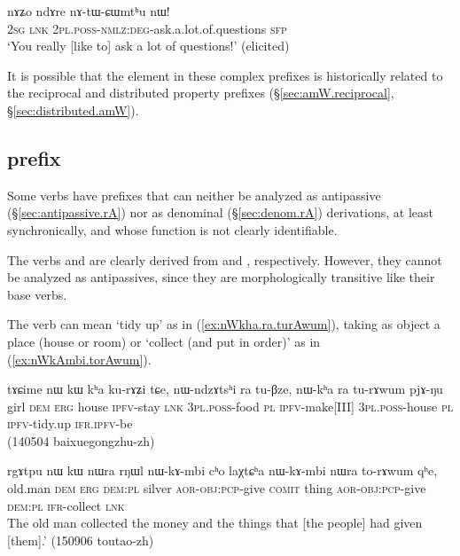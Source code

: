  \begin{exe}
\ex \label{ex:nAtWCWmthu}
\gll nɤʑo ndɤre nɤ-tɯ-ɕɯmtʰu nɯ! \\
\textsc{2sg} \textsc{lnk} \textsc{2pl}.\textsc{poss}-\textsc{nmlz}:\textsc{deg}-ask.a.lot.of.questions \textsc{sfp} \\
\glt `You really [like to] ask a lot of questions!' (elicited)
\end{exe}

It is possible that the  element in these complex prefixes is historically related to the  reciprocal and distributed property prefixes (§\ref{sec:amW.reciprocal}, §\ref{sec:distributed.amW}).


\subsection{ prefix} \label{sec:rA.non.apass}
Some verbs have  prefixes that can neither be analyzed as antipassive (§\ref{sec:antipassive.rA}) nor as denominal (§\ref{sec:denom.rA}) derivations, at least synchronically, and whose function is not clearly identifiable.

The verbs  and  are clearly derived from  and , respectively. However, they cannot be analyzed as antipassives, since they are morphologically transitive like their base verbs.

The verb  can mean `tidy up' as in (\ref{ex:nWkha.ra.turAwum}), taking as object a place (house or room) or `collect (and put in order)' as in (\ref{ex:nWkAmbi.torAwum}).

\begin{exe}
\ex \label{ex:nWkha.ra.turAwum}
\gll  tɤɕime nɯ kɯ kʰa ku-rɤʑi tɕe, nɯ-ndzɤtsʰi ra tu-βze, nɯ-kʰa ra tu-rɤwum pjɤ-ŋu \\
girl \textsc{dem} \textsc{erg} house \textsc{ipfv}-stay \textsc{lnk} \textsc{3pl}.\textsc{poss}-food \textsc{pl} \textsc{ipfv}-make[III]  \textsc{3pl}.\textsc{poss}-house \textsc{pl} \textsc{ipfv}-tidy.up \textsc{ifr}.\textsc{ipfv}-be \\
\glt (140504 baixuegongzhu-zh)
\end{exe}

\begin{exe}
\ex \label{ex:nWkAmbi.torAwum}
\gll rgɤtpu nɯ kɯ nɯra rŋɯl nɯ-kɤ-mbi cʰo laχtɕʰa nɯ-kɤ-mbi nɯra to-rɤwum qʰe, \\
old.man \textsc{dem} \textsc{erg} \textsc{dem}:\textsc{pl} silver \textsc{aor}-\textsc{obj}:\textsc{pcp}-give \textsc{comit} thing \textsc{aor}-\textsc{obj}:\textsc{pcp}-give \textsc{dem}:\textsc{pl} \textsc{ifr}-collect \textsc{lnk} \\
\glt  The old man collected the money and the things that [the people] had given [them].' (150906 toutao-zh)
\end{exe}

